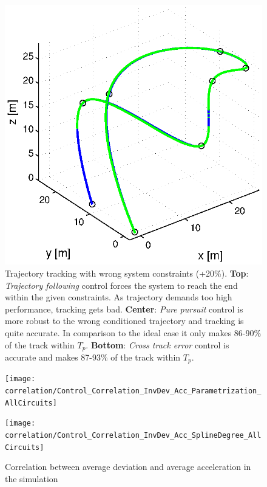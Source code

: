 \begin{figure}[h]
  \hfill
  \begin{minipage}[t]{0.32\textwidth}
    \includegraphics[width = \textwidth]{trackings_wc/figure_3D_agile_SplineDegree3_crossTrack_Disturbance_0}
  \end{minipage}
  \caption{Trajectory tracking with wrong system constraints (+20\%). {\bf Top}: \textit{Trajectory following} control forces the system to reach the end within the given constraints. As trajectory demands too high performance, tracking gets bad. {\bf Center}: \textit{Pure pursuit} control is more robust to the wrong conditioned trajectory and tracking is quite accurate. In comparison to the ideal case it only makes 86-90\% of the track within $T_p$. {\bf Bottom}: \textit{Cross track error} control is accurate and makes 87-93\% of the track within $T_p$.}
  \label{fig:results_model_uncertainties}
\end{figure}

\begin{figure}[h]
  \begin{minipage}[t]{0.48\textwidth}
    \texttt{[image: correlation/Control\_Correlation\_InvDev\_Acc\_Parametrization\_AllCircuits]}
  \end{minipage}
  \hfill
  \begin{minipage}[t]{0.48\textwidth}
    \texttt{[image: correlation/Control\_Correlation\_InvDev\_Acc\_SplineDegree\_AllCircuits]}
  \end{minipage}
  \caption{Correlation between average deviation and average acceleration in the simulation}
  \label{fig:correlation_invdev_acc_all_circuits}
\end{figure}

